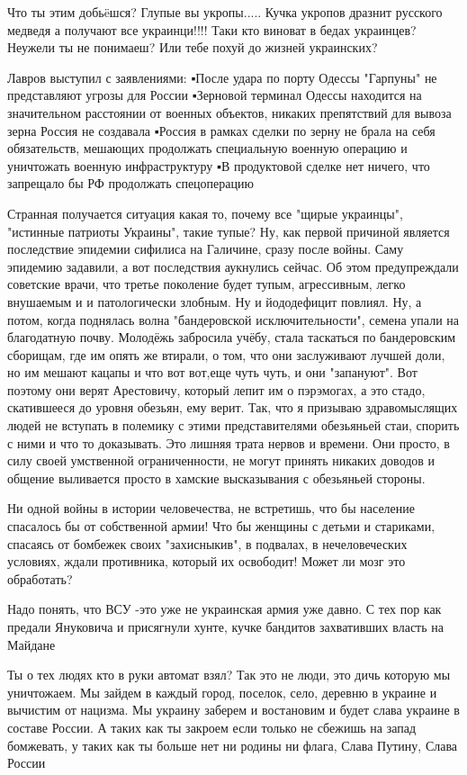Что ты этим добьëшся? Глупые вы укропы..... Кучка укропов дразнит русского
медведя а получают все украинци!!!!  Таки кто виноват в бедах украинцев?
Неужели ты не понимаеш? Или тебе похуй до жизней украинских?

Лавров выступил с заявлениями:
▪После удара по порту Одессы "Гарпуны" не представляют угрозы для России
▪Зерновой терминал Одессы находится на значительном расстоянии от военных объектов, никаких препятствий для вывоза зерна Россия не создавала
▪Россия в рамках сделки по зерну не брала на себя обязательств, мешающих продолжать специальную военную операцию и уничтожать военную инфраструктуру
▪В продуктовой сделке нет ничего, что запрещало бы РФ продолжать спецоперацию

Странная получается ситуация какая то, почему все "щирые украинцы", "истинные
патриоты Украины", такие тупые? Ну, как первой причиной является последствие
эпидемии сифилиса на Галичине, сразу после войны. Саму эпидемию задавили, а вот
последствия аукнулись сейчас. Об этом предупреждали советские врачи, что третье
поколение будет тупым, агрессивным, легко внушаемым и и патологически злобным.
Ну и йододефицит повлиял. Ну, а потом, когда поднялась волна "бандеровской
исключительности", семена упали на благодатную почву. Молодёжь забросила учёбу,
стала таскаться по бандеровским сборищам, где им опять же втирали, о том, что
они заслуживают лучшей доли, но им мешают кацапы и что вот вот,еще чуть чуть, и
они "запануют". Вот поэтому они верят Арестовичу, который лепит им о пэрэмогах,
а это стадо, скатившееся до уровня обезьян, ему верит. Так, что я призываю
здравомыслящих людей не вступать в полемику с этими представителями обезьяньей
стаи, спорить с ними и что то доказывать. Это лишняя трата нервов и времени.
Они просто, в силу своей умственной ограниченности, не могут принять никаких
доводов и общение выливается просто в хамские высказывания с обезьяньей
стороны.

Ни одной войны в истории человечества, не встретишь, что бы население спасалось
бы от собственной армии! Что бы женщины с детьми и стариками, спасаясь от
бомбежек своих "захисныкив", в подвалах, в нечеловеческих условиях, ждали
противника, который их освободит! Может ли мозг это обработать?

Надо понять, что ВСУ -это уже не украинская армия уже давно. С тех пор как
предали Януковича и присягнули хунте, кучке бандитов захвативших власть на
Майдане

Ты о тех людях кто в руки автомат взял? Так это не люди, это дичь которую мы
уничтожаем. Мы зайдем в каждый город, поселок, село, деревню в украине и
вычистим от нацизма. Мы украину заберем и востановим и будет слава украине в
составе России. А таких как ты закроем если только не сбежишь на запад
бомжевать, у таких как ты больше нет ни родины ни флага, Слава Путину, Слава
России

